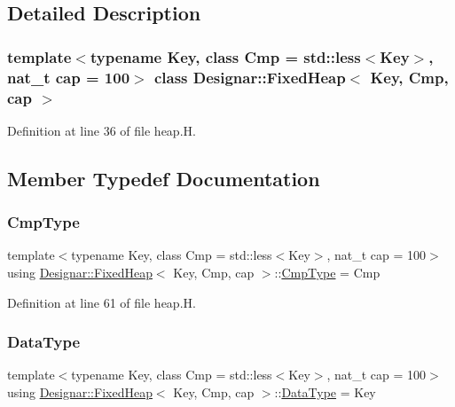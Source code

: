 \subsection{Detailed Description}
\subsubsection*{template$<$typename Key, class Cmp = std\+::less$<$\+Key$>$, nat\+\_\+t cap = 100$>$\newline
class Designar\+::\+Fixed\+Heap$<$ Key, Cmp, cap $>$}



Definition at line 36 of file heap.\+H.



\subsection{Member Typedef Documentation}
\mbox{\label{class_designar_1_1_fixed_heap_a0dab9096a5119723285ee3d4f1a4cee9}} 
\subsubsection{\texorpdfstring{Cmp\+Type}{CmpType}}
{\footnotesize\ttfamily template$<$typename Key, class Cmp = std\+::less$<$\+Key$>$, nat\+\_\+t cap = 100$>$ \\
using \hyperlink{class_designar_1_1_fixed_heap}{Designar\+::\+Fixed\+Heap}$<$ Key, Cmp, cap $>$\+::\hyperlink{class_designar_1_1_fixed_heap_a0dab9096a5119723285ee3d4f1a4cee9}{Cmp\+Type} =  Cmp}



Definition at line 61 of file heap.\+H.

\mbox{\label{class_designar_1_1_fixed_heap_a48202f857a59e2753aa72625f0d90f94}} 
\subsubsection{\texorpdfstring{Data\+Type}{DataType}}
{\footnotesize\ttfamily template$<$typename Key, class Cmp = std\+::less$<$\+Key$>$, nat\+\_\+t cap = 100$>$ \\
using \hyperlink{class_designar_1_1_fixed_heap}{Designar\+::\+Fixed\+Heap}$<$ Key, Cmp, cap $>$\+::\hyperlink{class_designar_1_1_fixed_heap_a48202f857a59e2753aa72625f0d90f94}{Data\+Type} =  Key}




